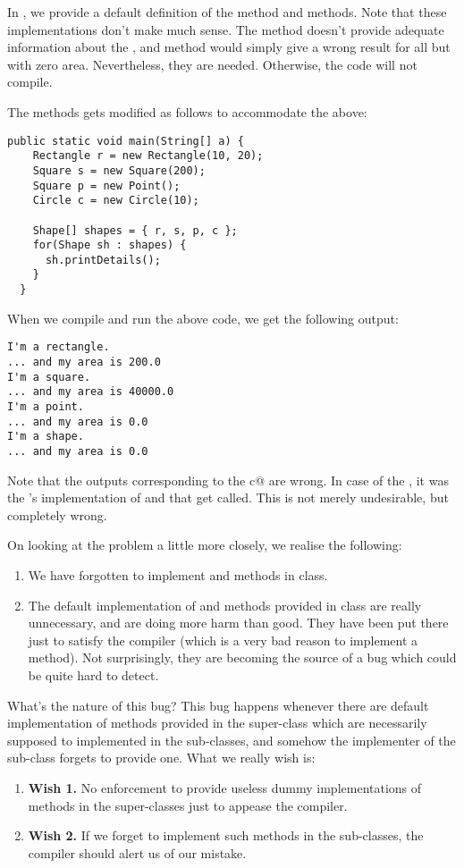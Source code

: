 \documentclass[12pt,a4paper]{article}
\begin{document}
In \lstinline@Shape@, we provide a default definition of the \lstinline@area@ method and \lstinline@printName@ methods. Note that these implementations don't make much sense. The \lstinline@printName@ method doesn't provide adequate information about the \lstinline@Shape@, and \lstinline@area@ method would simply give a wrong result for all but \lstinline@Shape@s with zero area. Nevertheless, they are needed. Otherwise, the code will not compile.

The \lstinline@main@ methods gets modified as follows to accommodate the above:
\begin{lstlisting}[frame=single]
  public static void main(String[] a) {
    Rectangle r = new Rectangle(10, 20);
    Square s = new Square(200);
    Square p = new Point();
    Circle c = new Circle(10);

    Shape[] shapes = { r, s, p, c };
    for(Shape sh : shapes) {
      sh.printDetails();
    }
  }
\end{lstlisting}

When we compile and run the above code, we get the following output:
\begin{lstlisting}[frame=single]
I'm a rectangle.
... and my area is 200.0
I'm a square.
... and my area is 40000.0
I'm a point.
... and my area is 0.0
I'm a shape.
... and my area is 0.0
\end{lstlisting}

Note that the outputs corresponding to the \lstinline@Circle c@ are wrong. In case of the \lstinline@Circle@, it was the \lstinline@Shape@'s implementation of \lstinline@printName@ and \lstinline@area@ that get called. This is not merely undesirable, but completely wrong.

On looking at the problem a little more closely, we realise the following:
\begin{enumerate}
	\item We have forgotten to implement \lstinline@printName@ and \lstinline@area@ methods in \lstinline@Circle@ class.
	\item The default implementation of \lstinline@printName@ and \lstinline@area@ methods provided in \lstinline@Shape@ class are really unnecessary, and are doing more harm than good. They have been put there just to satisfy the compiler (which is a very bad reason to implement a method). Not surprisingly, they are becoming the source of a bug which could be quite hard to detect.
\end{enumerate}

What's the nature of this bug? This bug happens whenever there are default implementation of methods provided in the super-class which are necessarily supposed to implemented in the sub-classes, and somehow the implementer of the sub-class forgets to provide one. What we really wish is:
\begin{enumerate}
	\item \textbf{Wish 1.} No enforcement to provide useless dummy implementations of methods in the super-classes just to appease the compiler.
	\item \textbf{Wish 2.} If we forget to implement such methods in the sub-classes, the compiler should alert us of our mistake.
\end{enumerate}
\end{document}
